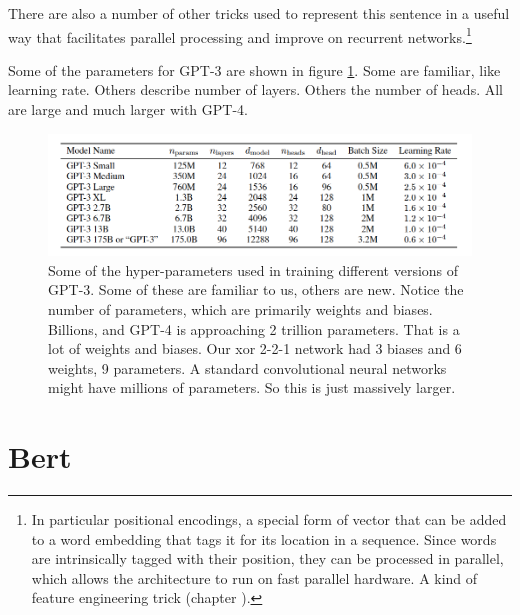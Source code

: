There are also a number of other tricks used to represent this sentence in a useful way that facilitates parallel processing and improve on recurrent networks.\footnote{In particular positional encodings, a special form of vector that can be added to a word embedding that tags it for its location in a sequence. Since words are intrinsically tagged with their position, they can be processed in parallel, which allows the architecture to run on fast parallel hardware. A kind of feature engineering trick (chapter ).  }

Some of the parameters for GPT-3 are shown in figure \ref{gptParams}. Some are familiar, like learning rate. Others describe number of layers. Others the number of heads. All are large and much larger with GPT-4.

\begin{figure}[h]
\centering
\includegraphics[scale=.4]{./images/gpt3_params.png}
\caption[GPT Technical report. Todo]{Some of the hyper-parameters used in training different versions of GPT-3. Some of these are familiar to us, others are new. Notice the number of parameters, which are primarily weights and biases.  Billions, and GPT-4 is approaching 2 trillion parameters.  That is a lot of weights and biases.  Our xor 2-2-1 network had 3 biases and 6 weights, 9 parameters.  A standard convolutional neural networks might have millions of parameters. So this is just massively larger. }
\label{gptParams}
\end{figure}

\section{Bert}\label{sect_bert}

